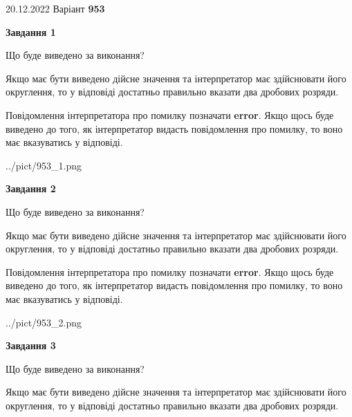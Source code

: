 \documentclass[12pt, ukrainian]{article}
\begin{document}
{20.12.2022 Варіант \No \textbf { 953 }\par}
{
\begin {Large}

{\begin {center}\textbf{Завдання 1}\end {center}}\par
Що буде виведено за виконання? \par

Якщо має бути виведено дійсне значення та інтерпретатор має здійснювати його округлення, 
то у відповіді достатньо правильно вказати два дробових розряди.

Повідомлення інтерпретатора про помилку позначати \textbf{error}.
Якщо щось буде виведено до того, як інтерпретатор видасть повідомлення про помилку, 
то воно має вказуватись у відповіді. \par

\begin{center}
	{../pict/953_1.png}
\end{center}
\newpage

{\begin {center}\textbf{Завдання 2}\end {center}}\par
Що буде виведено за виконання? \par

Якщо має бути виведено дійсне значення та інтерпретатор має здійснювати його округлення, 
то у відповіді достатньо правильно вказати два дробових розряди.

Повідомлення інтерпретатора про помилку позначати \textbf{error}.
Якщо щось буде виведено до того, як інтерпретатор видасть повідомлення про помилку, 
то воно має вказуватись у відповіді. \par

\begin{center}
	{../pict/953_2.png}
\end{center}
\newpage

{\begin {center}\textbf{Завдання 3}\end {center}}\par
Що буде виведено за виконання? \par

Якщо має бути виведено дійсне значення та інтерпретатор має здійснювати його округлення, 
то у відповіді достатньо правильно вказати два дробових розряди.


\end{Large}}
\end{document}
